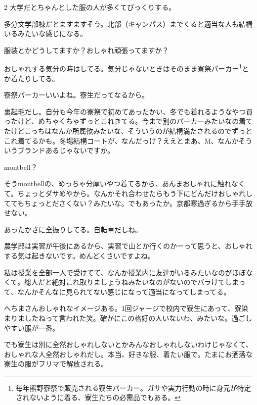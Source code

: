 \begin{multicols}{2}
 大学だとちゃんとした服の人が多くてびっくりする。

 多分文学部棟だとますますそう。北部（キャンパス）までくると適当な人も結構いるみたいな感じになる。


 服装とかどうしてますか？おしゃれ頑張ってますか？

 おしゃれする気分の時はしてる。気分じゃないときはそのまま寮祭パーカー\footnote{毎年熊野寮祭で販売される寮生パーカー。ガサや実力行動の時に身元が特定されないように着る、寮生たちの必需品でもある。}とか着たりしてる。

 寮祭パーカーいいよね。寮生だってなるから。

 裏起毛だし。自分も今年の寮祭で初めてあったかい、冬でも着れるようなやつ買ったけど、めちゃくちゃずっとこれきてる。今まで別のパーカーみたいなの着てたけどこっちはなんか所属欲みたいな、そういうのが結構満たされるのでずっとこれ着てるかも。冬場結構コートが、なんだっけ？ええとまあ、M、なんかそういうブランドあるじゃないですか。

 montbell？

 そうmontbellの、めっちゃ分厚いやつ着てるから、あんまおしゃれに触れなくて。ちょっとダサめやから。なんかそれ合わせたらもう下にどんだけおしゃれしててもちょっとださくない？みたいな。でもあったか。京都寒過ぎるから手手放せない。

 あったかさに全振りしてる。自転車だしね。

 農学部は実習が午後にあるから、実習で山とか行くのかーって思うと、おしゃれする気は起きないです。めんどくさいですよね。

 私は授業を全部一人で受けてて、なんか授業内に友達がいるみたいなのがほぼなくて。総人だと絶対これ取りましょうねみたいなのがないのでバラけてしまって、なんかそんなに見られてない感じになって適当になってしまってる。

 へちまさんおしゃれなイメージある。1回ジャージで校内で寮生にあって、寮染まりましたねって言われた笑。確かにこの格好の人いないわ、みたいな。過ごしやすい服が一番。

 でも寮生は別に全然おしゃれしないとかみんなおしゃれしないわけじゃなくて、おしゃれな人全然おしゃれだし。本当、好きな服、着たい服で。たまにお洒落な寮生の服がフリマで解放される。


\end{multicols}
